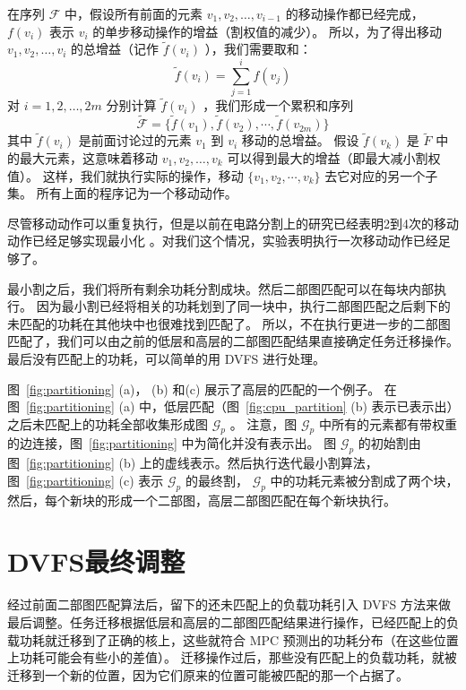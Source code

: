在序列 $\mathcal{F}$ 中，假设所有前面的元素 $v_1, v_2, \ldots, v_{i-1}$ 的移动操作都已经完成， $f(v_i)$ 表示 $v_i$ 的单步移动操作的增益（割权值的减少）。
所以，为了得出移动 $v_1, v_2, \ldots, v_i$ 的总增益（记作 $\tilde{f}(v_i)$ ），我们需要取和：
\begin{equation}
\tilde{f}(v_i) = \sum\limits_{j=1}^i f(v_j)
\end{equation}
对 $i=1,2, \ldots, 2m$ 分别计算 $\tilde{f}(v_i)$ ，我们形成一个累积和序列
\begin{equation}
\tilde{\mathcal{F}} = \{\tilde{f}(v_1), \tilde{f}(v_2), \cdots,
\tilde{f}(v_{2m})\}
\end{equation}
其中 $\tilde{f}(v_i)$ 是前面讨论过的元素 $v_1$ 到 $v_i$ 移动的总增益。
假设 $\tilde{f}(v_k)$ 是 $\tilde{F}$ 中的最大元素，这意味着移动 $v_1, v_2, \ldots, v_k$ 可以得到最大的增益（即最大减小割权值）。
这样，我们就执行实际的操作，移动 $\{v_1, v_2, \cdots, v_k\}$ 去它对应的另一个子集。
所有上面的程序记为一个移动动作。

尽管移动动作可以重复执行，但是以前在电路分割上的研究已经表明2到4次的移动动作已经足够实现最小化 \cite{Fidducia:DAC'82,Dutt:DAC'96} 。对我们这个情况，实验表明执行一次移动动作已经足够了。

最小割之后，我们将所有剩余功耗分割成块。然后二部图匹配可以在每块内部执行。
因为最小割已经将相关的功耗划到了同一块中，执行二部图匹配之后剩下的未匹配的功耗在其他块中也很难找到匹配了。
所以，不在执行更进一步的二部图匹配了，我们可以由之前的低层和高层的二部图匹配结果直接确定任务迁移操作。
最后没有匹配上的功耗，可以简单的用 DVFS 进行处理。

图~\ref{fig:partitioning} (a)， (b) 和(c) 展示了高层的匹配的一个例子。
在图~\ref{fig:partitioning} (a) 中，低层匹配（图~\ref{fig:cpu_partition} (b) 表示已表示出）之后未匹配上的功耗全部收集形成图 $\mathcal{G}_p$ 。
注意，图 $\mathcal{G}_p$ 中所有的元素都有带权重的边连接，图~\ref{fig:partitioning} 中为简化并没有表示出。
图 $\mathcal{G}_p$ 的初始割由图~\ref{fig:partitioning} (b) 上的虚线表示。然后执行迭代最小割算法，
图~\ref{fig:partitioning} (c) 表示 $\mathcal{G}_p$ 的最终割， $\mathcal{G}_p$ 中的功耗元素被分割成了两个块，
然后，每个新块的形成一个二部图，高层二部图匹配在每个新块执行。


\section{DVFS最终调整}\label{sec:dvfs_adj}

经过前面二部图匹配算法后，留下的还未匹配上的负载功耗引入 DVFS 方法来做最后调整。任务迁移根据低层和高层的二部图匹配结果进行操作，已经匹配上的负载功耗就迁移到了正确的核上，这些就符合 MPC 预测出的功耗分布（在这些位置上功耗可能会有些小的差值）。
迁移操作过后，那些没有匹配上的负载功耗，就被迁移到一个新的位置，因为它们原来的位置可能被匹配的那一个占据了。


